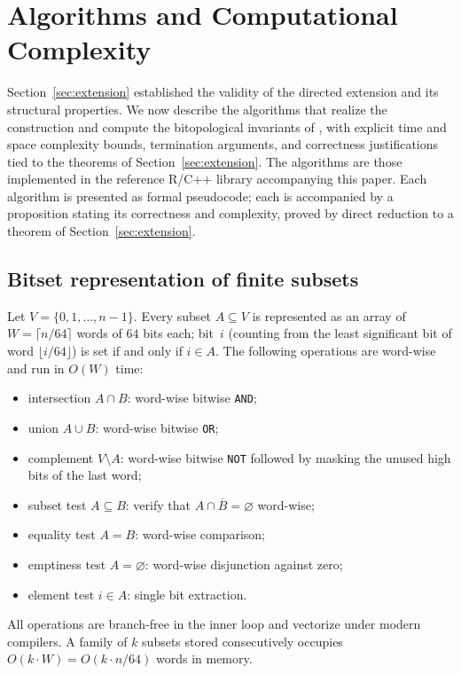 \documentclass[11pt,a4paper]{article}
\theoremstyle{plain}
\theoremstyle{definition}
\begin{document}
\section{Algorithms and Computational Complexity}\label{sec:algorithms}

Section~\ref{sec:extension} established the validity of the directed extension
and its structural properties.  We now describe the algorithms that realize
the construction and compute the bitopological invariants of
, with explicit time and space complexity
bounds, termination arguments, and correctness justifications tied to the
theorems of Section~\ref{sec:extension}.  The algorithms are those implemented
in the reference R/C++ library accompanying this paper.  Each algorithm is
presented as formal pseudocode; each is accompanied by a proposition stating
its correctness and complexity, proved by direct reduction to a theorem of
Section~\ref{sec:extension}.


\subsection{Bitset representation of finite subsets}%
\label{subsec:bitset}

Let $V = \{0, 1, \ldots, n-1\}$.  Every subset $A \subseteq V$ is represented
as an array of $W = \lceil n/64 \rceil$ words of $64$ bits each; bit~$i$
(counting from the least significant bit of word $\lfloor i/64 \rfloor$) is
set if and only if $i \in A$.  The following operations are word-wise and
run in $O(W)$ time:
\begin{itemize}[leftmargin=2em]
  \item intersection $A \cap B$: word-wise bitwise \texttt{AND};
  \item union $A \cup B$: word-wise bitwise \texttt{OR};
  \item complement $V \setminus A$: word-wise bitwise \texttt{NOT} followed
        by masking the unused high bits of the last word;
  \item subset test $A \subseteq B$: verify that
        $A \cap \overline{B} = \varnothing$ word-wise;
  \item equality test $A = B$: word-wise comparison;
  \item emptiness test $A = \varnothing$: word-wise disjunction against zero;
  \item element test $i \in A$: single bit extraction.
\end{itemize}
All operations are branch-free in the inner loop and vectorize under modern
compilers.  A family of $k$ subsets stored consecutively occupies
$O(k \cdot W) = O(k \cdot n / 64)$ words in memory.
\end{document}

